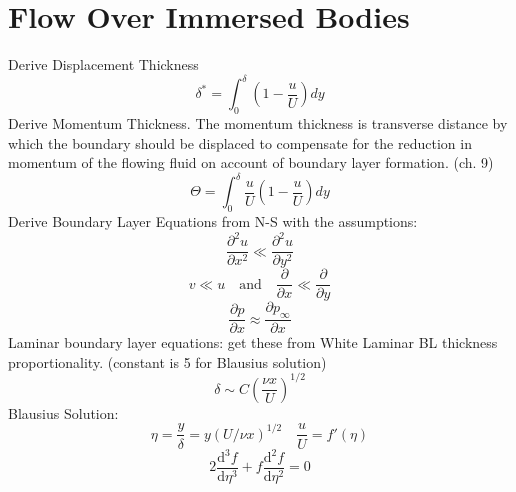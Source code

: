 \documentclass{article}
\begin{document}
%
%
\newpage
\section{Flow Over Immersed Bodies}

Derive Displacement Thickness
\begin{equation}
  \delta^* = \int_0^\delta (1-\frac{u}{U})dy
\end{equation}
\newline
\newline
Derive Momentum Thickness. The momentum thickness is transverse distance by which the boundary should be displaced to compensate for the reduction in momentum of the flowing fluid on account of boundary layer formation. (ch. 9)
\begin{equation}
  \Theta = \int_0^\delta \frac{u}{U}(1-\frac{u}{U})dy
\end{equation}
\newline
\newline
Derive Boundary Layer Equations from N-S with the assumptions:
\begin{equation}
  \frac{\partial^2 u}{\partial x^2} \ll \frac{\partial^2 u}{\partial y^2}
\end{equation}
\begin{equation}
  v \ll u\quad\text{and}\quad\frac{\partial}{\partial x} \ll \frac{\partial}{\partial y}
\end{equation}
\begin{equation}
  \frac{\partial p}{\partial x} \approx \frac{\partial p_\infty}{\partial x}
\end{equation}
\newline
\newline
Laminar boundary layer equations: get these from White
\newline
\newline
Laminar BL thickness proportionality. (constant is 5 for Blausius solution)
\begin{equation}
  \delta \sim C\left(\frac{\nu x}{U}\right)^{1/2}
\end{equation}
\newline
\newline
Blausius Solution:
\begin{equation}
  \eta=\frac{y}{\delta}=y(U/\nu x)^{1/2}\quad\frac{u}{U}=f'(\eta)
\end{equation}
\begin{equation}
  2 \frac{\text{d}^3 f}{\text{d} \eta^3} + f \frac{\text{d}^2 f}{\text{d} \eta^2} = 0
\end{equation}
\end{document}
